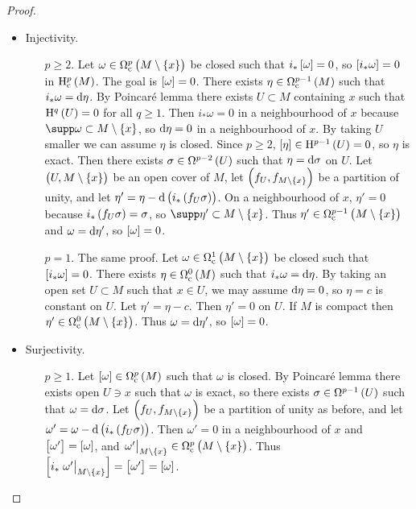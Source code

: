 \begin{proof}
\hfill
\begin{itemize}
\item Injectivity.
\begin{itemize}
\item[$ p \ge 2 $.] Let $ \omega \in \Omega_\c^p\br{M \setminus \cbr{x}} $ be closed such that $ i_*\sbr{\omega} = 0 $, so $ \sbr{i_*\omega} = 0 $ in $ \H_\c^p\br{M} $. The goal is $ \sbr{\omega} = 0 $. There exists $ \eta \in \Omega_\c^{p - 1}\br{M} $ such that $ i_*\omega = \mathrm{d}\eta $. By Poincar\'e lemma there exists $ U \subset M $ containing $ x $ such that $ \H^q\br{U} = 0 $ for all $ q \ge 1 $. Then $ i_*\omega = 0 $ in a neighbourhood of $ x $ because $ \supp \omega \subset M \setminus \cbr{x} $, so $ \mathrm{d}\eta = 0 $ in a neighbourhood of $ x $. By taking $ U $ smaller we can assume $ \eta $ is closed. Since $ p \ge 2 $, $ \sbr{\eta} \in \H^{p - 1}\br{U} = 0 $, so $ \eta $ is exact. Then there exists $ \sigma \in \Omega^{p - 2}\br{U} $ such that $ \eta = \mathrm{d}\sigma $ on $ U $. Let $ \br{U, M \setminus \cbr{x}} $ be an open cover of $ M $, let $ \br{f_U, f_{M \setminus \cbr{x}}} $ be a partition of unity, and let $ \eta' = \eta - \d\br{i_*\br{f_U\sigma}} $. On a neighbourhood of $ x $, $ \eta' = 0 $ because $ i_*\br{f_U\sigma} = \sigma $, so $ \supp \eta' \subset M \setminus \cbr{x} $. Thus $ \eta' \in \Omega_\c^{p - 1}\br{M \setminus \cbr{x}} $ and $ \omega = \mathrm{d}\eta' $, so $ \sbr{\omega} = 0 $.
\item[$ p = 1 $.] The same proof. Let $ \omega \in \Omega_\c^1\br{M \setminus \cbr{x}} $ be closed such that $ \sbr{i_*\omega} = 0 $. There exists $ \eta \in \Omega_\c^0\br{M} $ such that $ i_*\omega = \mathrm{d}\eta $. By taking an open set $ U \subset M $ such that $ x \in U $, we may assume $ \mathrm{d}\eta = 0 $, so $ \eta = c $ is constant on $ U $. Let $ \eta' = \eta - c $. Then $ \eta' = 0 $ on $ U $. If $ M $ is compact then $ \eta' \in \Omega_\c^0\br{M \setminus \cbr{x}} $. Thus $ \omega = \mathrm{d}\eta' $, so $ \sbr{\omega} = 0 $.
\end{itemize}
\item Surjectivity.
\begin{itemize}
\item[$ p \ge 1 $.] Let $ \sbr{\omega} \in \Omega_\c^p\br{M} $ such that $ \omega $ is closed. By Poincar\'e lemma there exists open $ U \ni x $ such that $ \omega $ is exact, so there exists $ \sigma \in \Omega^{p - 1}\br{U} $ such that $ \omega = \mathrm{d}\sigma $. Let $ \br{f_U, f_{M \setminus \cbr{x}}} $ be a partition of unity as before, and let $ \omega' = \omega - \d\br{i_*\br{f_U\sigma}} $. Then $ \omega' = 0 $ in a neighbourhood of $ x $ and $ \sbr{\omega'} = \sbr{\omega} $, and $ \eval{\omega'}_{M \setminus \cbr{x}} \in \Omega_\c^p\br{M \setminus \cbr{x}} $. Thus $ \sbr{i_*\eval{\omega'}_{M \setminus \cbr{x}}} = \sbr{\omega'} = \sbr{\omega} $.
\end{itemize}
\end{itemize}
\end{proof}

